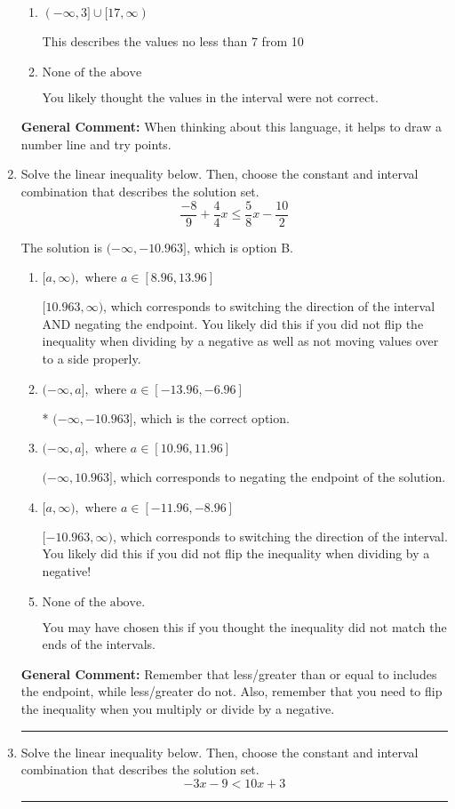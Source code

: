 \documentclass{extbook}[14pt]
\newcommand{\litem}[1]{\item #1

\rule{\textwidth}{0.4pt}}
\begin{document}
\begin{enumerate}
{\begin{enumerate}[label=\Alph*.]
This describes the values no more than 7 from 10
\item \( (-\infty, 3] \cup [17, \infty) \)

This describes the values no less than 7 from 10
\item \( \text{None of the above} \)

You likely thought the values in the interval were not correct.
\end{enumerate}

\textbf{General Comment:} When thinking about this language, it helps to draw a number line and try points.
}
\litem{
Solve the linear inequality below. Then, choose the constant and interval combination that describes the solution set.
\[ \frac{-8}{9} + \frac{4}{4} x \leq \frac{5}{8} x - \frac{10}{2} \]

The solution is \( (-\infty, -10.963] \), which is option B.\begin{enumerate}[label=\Alph*.]
\item \( [a, \infty), \text{ where } a \in [8.96, 13.96] \)

 $[10.963, \infty)$, which corresponds to switching the direction of the interval AND negating the endpoint. You likely did this if you did not flip the inequality when dividing by a negative as well as not moving values over to a side properly.
\item \( (-\infty, a], \text{ where } a \in [-13.96, -6.96] \)

* $(-\infty, -10.963]$, which is the correct option.
\item \( (-\infty, a], \text{ where } a \in [10.96, 11.96] \)

 $(-\infty, 10.963]$, which corresponds to negating the endpoint of the solution.
\item \( [a, \infty), \text{ where } a \in [-11.96, -8.96] \)

 $[-10.963, \infty)$, which corresponds to switching the direction of the interval. You likely did this if you did not flip the inequality when dividing by a negative!
\item \( \text{None of the above}. \)

You may have chosen this if you thought the inequality did not match the ends of the intervals.
\end{enumerate}

\textbf{General Comment:} Remember that less/greater than or equal to includes the endpoint, while less/greater do not. Also, remember that you need to flip the inequality when you multiply or divide by a negative.
}
\litem{
Solve the linear inequality below. Then, choose the constant and interval combination that describes the solution set.
\[ -3x -9 < 10x + 3 \]

}
\end{enumerate}
\end{document}
